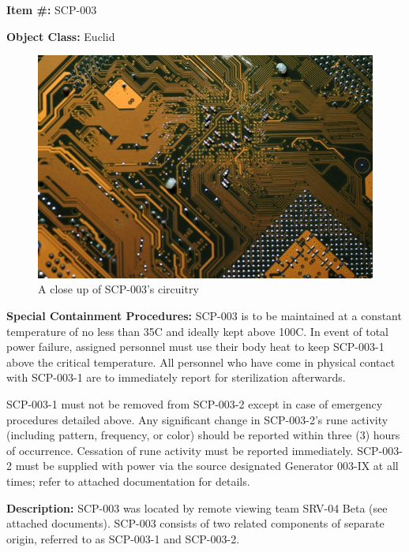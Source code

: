 \textbf{Item \#:} SCP-003

\textbf{Object Class:} Euclid

\begin{figure}[h]
\begin{center}
\includegraphics[scale=0.4]{scp/003.jpg}
\linebreak A close up of SCP-003's circuitry
\end{center}
\end{figure}

\textbf{Special Containment Procedures:} SCP-003 is to be maintained at a constant temperature of no less than 35\degree C and ideally kept above 100\degree C. In event of total power failure, assigned personnel must use their body heat to keep SCP-003-1 above the critical temperature. All personnel who have come in physical contact with SCP-003-1 are to immediately report for sterilization afterwards.

SCP-003-1 must not be removed from SCP-003-2 except in case of emergency procedures detailed above. Any significant change in SCP-003-2's rune activity (including pattern, frequency, or color) should be reported within three (3) hours of occurrence. Cessation of rune activity must be reported immediately. SCP-003-2 must be supplied with power via the source designated Generator 003-IX at all times; refer to attached documentation for details.

\textbf{Description:} SCP-003 was located by remote viewing team SRV-04 Beta (see attached documents). SCP-003 consists of two related components of separate origin, referred to as SCP-003-1 and SCP-003-2.

